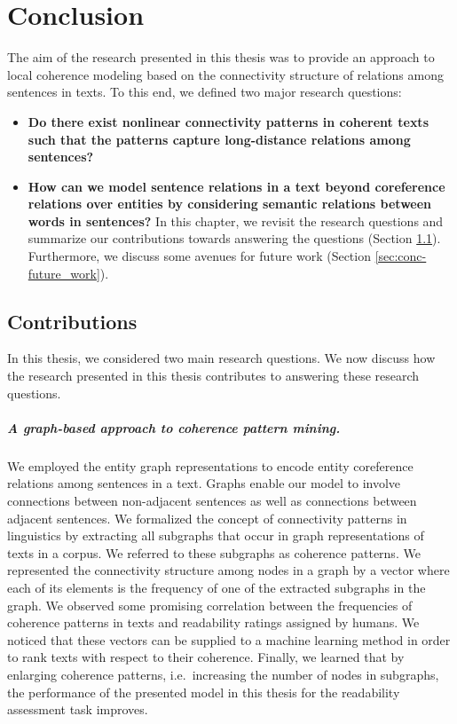 
\chapter{Conclusion} 
\label{ch:conc} 
The aim of the research presented in this thesis was to provide an approach to local coherence modeling based on the connectivity structure of relations among sentences in  texts. 
To this end, we defined two major research questions: 
\begin{itemize}
\item \textbf{Do there exist nonlinear connectivity patterns in coherent texts such that the patterns capture \mbox{long-distance} relations among sentences?} 
\item \textbf{How can we model sentence relations in a text beyond coreference relations over entities by considering semantic relations between words in sentences?} 
In this chapter, we revisit the research questions and summarize our contributions towards answering the questions (Section \ref{sec:conc-contributions}). 
Furthermore, we discuss some avenues for future work (Section \ref{sec:conc-future_work}).
\end{itemize}

\section{Contributions}
\label{sec:conc-contributions}


In this thesis, we considered two main research questions. 
We now discuss how the research presented in this thesis contributes to answering these research questions.

\paragraph{A graph-based approach to coherence pattern mining.} 
We employed the entity graph representations to encode entity coreference relations among sentences in a text. 
Graphs enable our model to involve connections between non-adjacent sentences as well as connections between adjacent sentences. 
We formalized the concept of connectivity patterns in linguistics \cite{danes74a,stoddard91} by extracting all subgraphs that occur in graph representations of texts in a corpus. 
We referred to these subgraphs as coherence patterns. 
We represented the connectivity structure among nodes in a graph by a vector where each of its elements is the frequency of one of the extracted subgraphs in the graph. 
We observed some promising correlation between the frequencies of coherence patterns in texts and  readability ratings assigned by humans. 
We noticed that these vectors can be supplied to a machine learning method in order to rank texts with respect to their coherence. 
Finally, we learned that by enlarging coherence patterns, i.e.\ increasing the number of nodes in subgraphs, the performance of the presented model in this thesis for the readability assessment task improves. 

